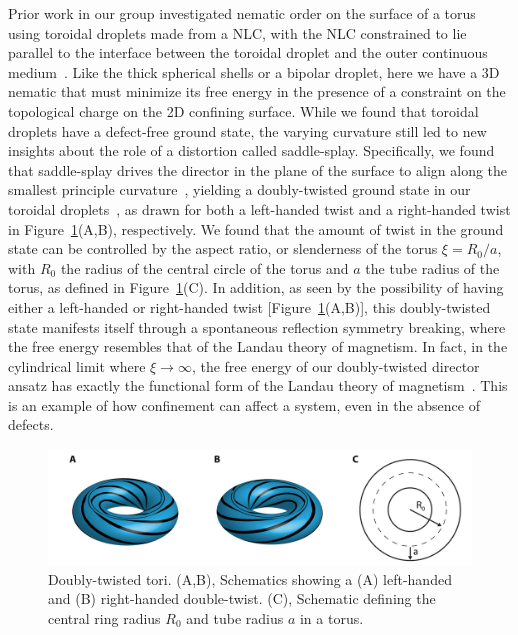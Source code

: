 Prior work in our group investigated nematic order on the surface of a torus using toroidal droplets made from a NLC, with the NLC constrained to lie parallel to the interface between the toroidal droplet and the outer continuous medium~\cite{RN24,RN47}.
Like the thick spherical shells or a bipolar droplet, here we have a 3D nematic that must minimize its free energy in the presence of a constraint on the topological charge on the 2D confining surface.
While we found that toroidal droplets have a defect-free ground state, the varying curvature still led to new insights about the role of a distortion called saddle-splay.
Specifically, we found that saddle-splay drives the director in the plane of the surface to align along the smallest principle curvature~\cite{RN59}, yielding a doubly-twisted ground state in our toroidal droplets~\cite{RN24}, as drawn for both a left-handed twist and a right-handed twist in Figure~\ref{f:1-Torus}(A,B), respectively.
We found that the amount of twist in the ground state can be controlled by the aspect ratio, or slenderness of the torus $\xi = R_0/a$, with $R_0$ the radius of the central circle of the torus and $a$ the tube radius of the torus, as defined in Figure~\ref{f:1-Torus}(C).
In addition, as seen by the possibility of having either a left-handed or right-handed twist [Figure~\ref{f:1-Torus}(A,B)], this doubly-twisted state manifests itself through a spontaneous reflection symmetry breaking, where the free energy resembles that of the Landau theory of magnetism.
In fact, in the cylindrical limit where $\xi \rightarrow \infty$, the free energy of our doubly-twisted director ansatz has exactly the functional form of the Landau theory of magnetism~\cite{RN293}.
This is an example of how confinement can affect a system, even in the absence of defects.
\begin{figure}
  \centering
  \includegraphics{figures/C1/Ch1-Figs_Torus.png}
  \caption{Doubly-twisted tori.
  (A,B), Schematics showing a (A) left-handed and (B) right-handed double-twist.
  (C), Schematic defining the central ring radius $R_0$ and tube radius $a$ in a torus.}\label{f:1-Torus}
\end{figure}

